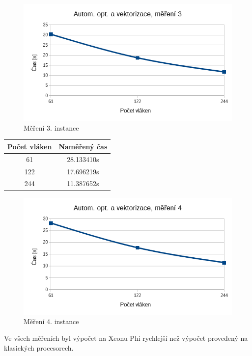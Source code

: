 \documentclass[12pt]{article}
\begin{document}
\begin{figure}[H]
  \begin{center}
      \includegraphics[width=12cm]{images/phi3.png}	
    \caption{Měření 3. instance} 
  \end{center}
\end{figure}
%
%
\begin{center}
\begin{tabular}{ c | c }
\textbf{Počet vláken} & \textbf{Naměřený čas} \\ \hline \hline 
61 & 28.133410s \\ \hline
122 & 17.696219s \\ \hline
244 & 11.387652s \\ \hline
\end{tabular}
\end{center}

\begin{figure}[H]
  \begin{center}
      \includegraphics[width=12cm]{images/phi4.png}	
    \caption{Měření 4. instance} 
  \end{center}
\end{figure}

Ve všech měřeních byl výpočet na Xeonu Phi rychlejší než výpočet provedený na klasických procesorech.
\end{document}
